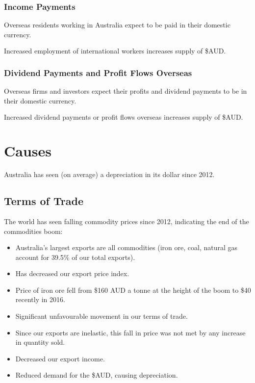 \documentclass[a4paper,11pt]{report}
\begin{document}
\subsubsection{Income Payments}

Overseas residents working in Australia expect to be paid in their domestic
currency.

Increased employment of international workers increases supply of \$AUD.

\subsubsection{Dividend Payments and Profit Flows Overseas}

Overseas firms and investors expect their profits and dividend payments to be
in their domestic currency.

Increased dividend payments or profit flows overseas increases supply of \$AUD.


\section{Causes}

Australia has seen (on average) a depreciation in its dollar since 2012.

\subsection{Terms of Trade}

The world has seen falling commodity prices since 2012, indicating the end of
the commodities boom:

\begin{itemize}
\item Australia's largest exports are all commodities (iron ore, coal, natural
	gas account for 39.5\% of our total exports).
\item Has decreased our export price index.
\item Price of iron ore fell from \$160 AUD a tonne at the height of the boom
	to \$40 recently in 2016.
\item Significant unfavourable movement in our terms of trade.
\item Since our exports are inelastic, this fall in price was not met by any
	increase in quantity sold.
\item Decreased our export income.
\item Reduced demand for the \$AUD, causing depreciation.
\end{itemize}
\end{document}
